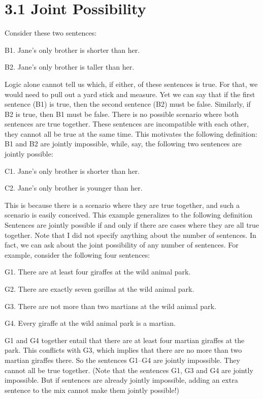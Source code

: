\section{3.1 Joint Possibility}
Consider these two sentences:
\begin{ebullet}
\item[B1.] Jane’s only brother is shorter than her.
\item[B2.] Jane’s only brother is taller than her.
\end{ebullet}
Logic alone cannot tell us which, if either, of these sentences is true. For that, we would need to pull out a yard stick and measure. Yet we can say that if the first sentence (B1) is true, then the second sentence (B2) must be false. Similarly, if B2 is true, then B1 must be false. There is no possible scenario where both sentences are true together. These sentences are incompatible with each other, they cannot all be true at the same time. This motivates the following definition:
B1 and B2 are jointly impossible, while, say, the following two sentences are jointly possible:
\begin{ebullet}
\item[C1.] Jane’s only brother is shorter than her.
\item[C2.] Jane’s only brother is younger than her.
\end{ebullet}
This is because there is a scenario where they are true together, and such a scenario is easily conceived. This example generalizes to the following definition
Sentences are jointly possible if and only if there are cases where they are all true together.
Note that I did not specify anything about the number of sentences. In fact, we can ask about the joint possibility of any number of sentences. For example, consider the following four sentences:
\begin{ebullet}
\item[G1.] There are at least four giraffes at the wild animal park.
\item[G2.] There are exactly seven gorillas at the wild animal park.
\item[G3.] There are not more than two martians at the wild animal park.
\item[G4.] Every giraffe at the wild animal park is a martian.
\end{ebullet}
G1 and G4 together entail that there are at least four martian giraffes at the park. This conflicts with G3, which implies that there are no more than two martian giraffes there. So the sentences G1–G4 are jointly impossible. They cannot all be true together. (Note that the sentences G1, G3 and G4 are jointly impossible. But if sentences are already jointly impossible, adding an extra sentence to the mix cannot make them jointly possible!)


